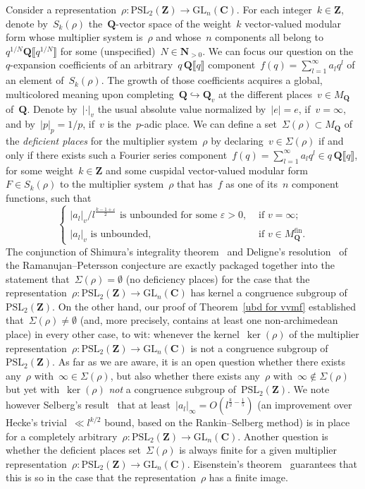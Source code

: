 \documentclass[10pt]{amsart}
\def\NwithoutzeroA{\mathbf{N}_{> 0}}
\def\PSL{\mathrm{PSL}}
\def\Z{\mathbf{Z}}
\def\Q{\mathbf{Q}}
\def\GL{\mathrm{GL}}
\theoremstyle{remark}
\numberwithin{equation}{subsection}
\def\C{\mathbf{C}}
\begin{document}
 Consider a representation~$\rho : \PSL_2(\Z) \to \GL_n(\C)$. 
For each integer~$k \in \Z$,  denote by~$S_k(\rho)$ the~$\Q$-vector space of the weight~$k$ vector-valued modular form whose multiplier system is~$\rho$ and whose~$n$ components all belong to~$q^{1/N} \Q\llbracket q^{1/N} \rrbracket$ for some (unspecified)~$N \in \NwithoutzeroA$. We can focus our question on the~$q$-expansion coefficients of an arbitrary~$q \, \Q\llbracket q \rrbracket$ component~$f(q) = \sum_{l =1}^{\infty} a_l q^l$ of an element of~$S_k(\rho)$. 
The growth of those coefficients acquires a global, multicolored meaning upon completing~$\Q \hookrightarrow \Q_v$ at the different places~$v \in M_{\Q}$ of~$\Q$. Denote by~$|\cdot|_v$ the usual absolute value normalized by~$|e| = e$, if~$v = \infty$, and by~$|p|_p = 1/p$, if~$v$ is the~$p$-adic place.  We can define a set~$\Sigma(\rho) \subset M_{\Q}$ of the \emph{deficient places} for the multiplier system~$\rho$ by declaring~$v \in \Sigma(\rho)$ if and only if there exists such a Fourier series component~$f(q) = \sum_{l=1}^{\infty} a_l q^l \in q \, \Q\llbracket q \rrbracket$, for some weight~$k \in \Z$ and some cuspidal vector-valued modular form~$F \in S_k(\rho)$ to the multiplier system~$\rho$ that has~$f$ as one of its~$n$ component functions, such that
$$
\left\{ \begin{array}{ll}  |a_l|_v\big/l^{\frac{k-1+\varepsilon}{2}} \textrm{ is unbounded for some~$\varepsilon > 0$},  & \textrm{ if } v = \infty; \\ |a_l|_v \textrm{ is unbounded}, & \textrm{ if } v \in M_{\Q}^{\mathrm{fin}}.  \end{array} \right.
$$
The conjunction of Shimura's integrality theorem~\cite[\S~8]{ShimuraEichler} and Deligne's resolution~\cite[{\it Th\'eor\`eme~8.2}]{DeligneWeilI} of the Ramanujan--Petersson conjecture are exactly packaged together into the statement that~$\Sigma(\rho) = \emptyset$ (no deficiency places) for the case that the representation~$\rho : \PSL_2(\Z) \to \GL_n(\C)$ has kernel a congruence subgroup of~$\PSL_2(\Z)$. On the other hand, our proof of Theorem~\ref{ubd for vvmf} established that~$\Sigma(\rho) \neq \emptyset$ (and, more precisely, contains at least one non-archimedean place) in every other case, to wit: whenever the kernel~$\ker(\rho)$ of the multiplier representation~$\rho : \PSL_2(\Z) \to \GL_n(\C)$ is not a congruence subgroup of~$\PSL_2(\Z)$. As far as we are aware, it is an open question whether there exists any~$\rho$ with~$\infty \in \Sigma(\rho)$, but also
whether there exists any~$\rho$ with~$\infty \notin \Sigma(\rho)$ but yet with~$\ker(\rho)$ \emph{not} a congruence subgroup of~$\PSL_2(\Z)$. We note however Selberg's result~\cite[\S~2]{Selberg} that at least~$|a_l|_{\infty}  = O\left( l^{\frac{k}{2}-\frac{1}{5}} \right)$ (an improvement over Hecke's trivial~$\ll l^{k/2}$ bound, based on the Rankin--Selberg method) is in place for a completely arbitrary~$\rho : \PSL_2(\Z) \to \GL_n(\C)$. Another question is whether the deficient places set~$\Sigma(\rho)$ is always finite for a given multiplier representation~$\rho : \PSL_2(\Z) \to \GL_n(\C)$.  Eisenstein's theorem~\cite[\S11.4]{BombieriGubler} guarantees that this is so in the case that the representation~$\rho$ has a finite image. 
\end{document}
